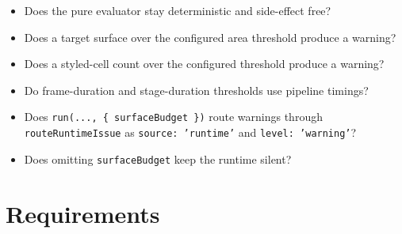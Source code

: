 \begin{itemize}
\tightlist
\item
  Does the pure evaluator stay deterministic and side-effect free?
\item
  Does a target surface over the configured area threshold produce a warning?
\item
  Does a styled-cell count over the configured threshold produce a warning?
\item
  Do frame-duration and stage-duration thresholds use pipeline timings?
\item
  Does \texttt{r\allowbreak{}u\allowbreak{}n\allowbreak{}(\allowbreak{}.\allowbreak{}.\allowbreak{}.\allowbreak{},\allowbreak{} \allowbreak{}\{\allowbreak{} \allowbreak{}s\allowbreak{}u\allowbreak{}r\allowbreak{}f\allowbreak{}a\allowbreak{}c\allowbreak{}e\allowbreak{}B\allowbreak{}u\allowbreak{}d\allowbreak{}g\allowbreak{}e\allowbreak{}t\allowbreak{} \allowbreak{}\}\allowbreak{})} route warnings through \texttt{r\allowbreak{}o\allowbreak{}u\allowbreak{}t\allowbreak{}e\allowbreak{}R\allowbreak{}u\allowbreak{}n\allowbreak{}t\allowbreak{}i\allowbreak{}m\allowbreak{}e\allowbreak{}I\allowbreak{}s\allowbreak{}s\allowbreak{}u\allowbreak{}e} as \texttt{s\allowbreak{}o\allowbreak{}u\allowbreak{}r\allowbreak{}c\allowbreak{}e\allowbreak{}:\allowbreak{} \allowbreak{}'\allowbreak{}r\allowbreak{}u\allowbreak{}n\allowbreak{}t\allowbreak{}i\allowbreak{}m\allowbreak{}e\allowbreak{}'} and \texttt{l\allowbreak{}e\allowbreak{}v\allowbreak{}e\allowbreak{}l\allowbreak{}:\allowbreak{} \allowbreak{}'\allowbreak{}w\allowbreak{}a\allowbreak{}r\allowbreak{}n\allowbreak{}i\allowbreak{}n\allowbreak{}g\allowbreak{}'}?
\item
  Does omitting \texttt{s\allowbreak{}u\allowbreak{}r\allowbreak{}f\allowbreak{}a\allowbreak{}c\allowbreak{}e\allowbreak{}B\allowbreak{}u\allowbreak{}d\allowbreak{}g\allowbreak{}e\allowbreak{}t} keep the runtime silent?
\end{itemize}

\section{Requirements}\label{record-157-requirements}

